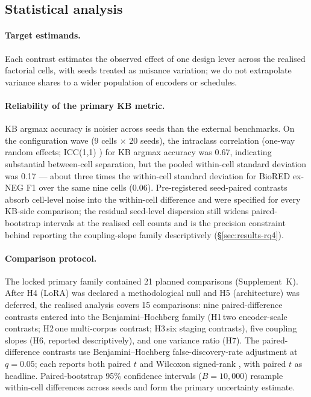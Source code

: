 \subsection{Statistical analysis}
\label{sec:stats}

\paragraph{Target estimands.}
Each contrast estimates the observed effect of one design lever
across the realised factorial cells, with seeds treated as
nuisance variation; we do not extrapolate variance shares to a
wider population of encoders or schedules.

\paragraph{Reliability of the primary KB metric.}
KB argmax accuracy is noisier across seeds than the external
benchmarks. On the configuration wave (9 cells $\times$ 20 seeds),
the intraclass correlation (one-way random effects; ICC(1,1)
\citep{shrout1979intraclass}) for KB argmax accuracy was 0.67,
indicating substantial between-cell separation, but the pooled
within-cell standard deviation was 0.17 --- about three times the
within-cell standard deviation for BioRED ex-NEG F1 over the same
nine cells (0.06). Pre-registered seed-paired contrasts
absorb cell-level noise into the within-cell difference and were
specified for every KB-side comparison; the residual seed-level
dispersion still widens paired-bootstrap intervals at the realised
cell counts and is the precision constraint behind reporting the
coupling-slope family descriptively (\S\ref{sec:results-rq4}).

\paragraph{Comparison protocol.}
The locked primary family contained 21 planned comparisons
(Supplement~K). After H4 (LoRA) was declared a methodological null
and H5 (architecture) was deferred, the realised analysis covers 15
comparisons: nine paired-difference contrasts entered into the
Benjamini--Hochberg family (H1$\,$two encoder-scale contrasts;
H2$\,$one multi-corpus contrast; H3$\,$six staging contrasts), five
coupling slopes (H6, reported descriptively), and one variance
ratio (H7). The paired-difference contrasts use
Benjamini--Hochberg false-discovery-rate adjustment
\citep{benjamini1995controlling} at \(q=0.05\); each reports both
paired \(t\) and Wilcoxon signed-rank
\citep{wilcoxon1945individual}, with paired \(t\) as headline.
Paired-bootstrap 95\% confidence intervals (\(B=10{,}000\)) resample
within-cell differences across seeds and form the primary
uncertainty estimate.

